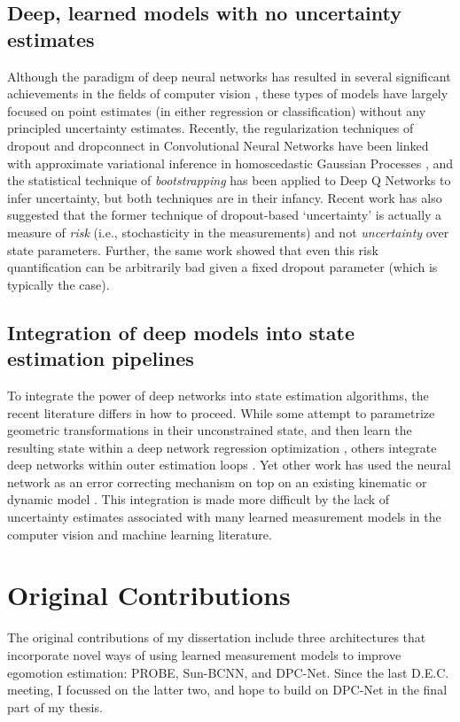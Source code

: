 \subsection{Deep, learned models with no uncertainty estimates}
Although the paradigm of deep neural networks has resulted in several significant achievements in the fields of computer vision \citep{LeCun2015-qf}, these types of models have largely focused on point estimates (in either regression or classification) without any principled uncertainty estimates. Recently, the regularization techniques of dropout and dropconnect in Convolutional Neural Networks have been linked with approximate variational inference in homoscedastic Gaussian Processes \citep{Gal2015-bf, Kendall2016-zf, McClure2016-ai}, and the statistical technique of \textit{bootstrapping} has been applied to Deep Q Networks \citep{Osband2016-jg} to infer uncertainty, but both techniques are in their infancy. Recent work \citep{Osband_undated-wl} has also suggested that the former technique of dropout-based `uncertainty' is actually a measure of \textit{risk} (i.e., stochasticity in the measurements) and not \textit{uncertainty} over state parameters. Further, the same work showed that even this risk quantification can be arbitrarily bad given a fixed dropout parameter (which is typically the case).

\subsection{Integration of deep models into state estimation pipelines}
 To integrate the power of deep networks into state estimation algorithms, the recent literature differs in how to proceed. While some attempt to parametrize geometric transformations in their unconstrained state, and then learn the resulting state within a deep network regression optimization \citep{Costante2016-hb, Kendall2015-kh}, others integrate deep networks within outer estimation loops \citep{Haarnoja2016-ph}. Yet other work has used the neural network as an error correcting mechanism on top on an existing kinematic or dynamic model \citep{Punjani2015-pj}. This integration is made more difficult by the lack of uncertainty estimates associated with many learned measurement models in the computer vision and machine learning literature.
 
 
\section{Original Contributions}
The original contributions of my dissertation include three architectures that incorporate novel ways of using learned measurement models to improve egomotion estimation: PROBE, Sun-BCNN, and DPC-Net. Since the last D.E.C. meeting, I focussed on the latter two, and hope to build on DPC-Net in the final part of my thesis.

